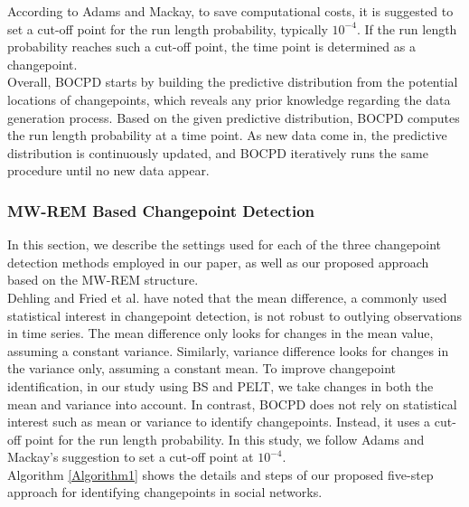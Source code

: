 \documentclass[]{interact}
\theoremstyle{plain}%
\theoremstyle{definition}
\theoremstyle{remark}
\begin{document}
{	According to Adams and Mackay\cite{adamsBayesianOnlineChangepoint2007}, to save computational costs, it is suggested to set a cut-off point for the run length probability, typically $10^{-4}$. If the run length probability reaches such a cut-off point, the time point is determined as a changepoint. \\
	
	Overall, BOCPD starts by building the predictive distribution from the potential locations of changepoints, which reveals any prior knowledge regarding the data generation process. Based on the given predictive distribution, BOCPD computes the run length probability at a time point. As new data come in, the predictive distribution is continuously updated, and BOCPD iteratively runs the same procedure until no new data appear.
	
	\subsubsection{MW-REM Based Changepoint Detection}
	
	\hspace{0.27cm} In this section, we describe the settings used for each of the three changepoint detection methods employed in our paper, as well as our proposed approach based on the MW-REM structure. \\
	
	Dehling and Fried et al. have noted that the mean difference, a commonly used statistical interest in changepoint detection, is not robust to outlying observations in time series\cite{dehlingRobustMethodShift2020}. The mean difference only looks for changes in the mean value, assuming a constant variance. Similarly, variance difference looks for changes in the variance only, assuming a constant mean. To improve changepoint identification, in our study using BS and PELT, we take changes in both the mean and variance into account. In contrast, BOCPD does not rely on statistical interest such as mean or variance to identify changepoints. Instead, it uses a cut-off point for the run length probability. In this study, we follow Adams and Mackay's suggestion to set a cut-off point at $10^{-4}$\cite{adamsBayesianOnlineChangepoint2007}. \\
	
	Algorithm \ref{Algorithm1} shows the details and steps of our proposed five-step approach for identifying changepoints in social networks.
	
}
\end{document}
